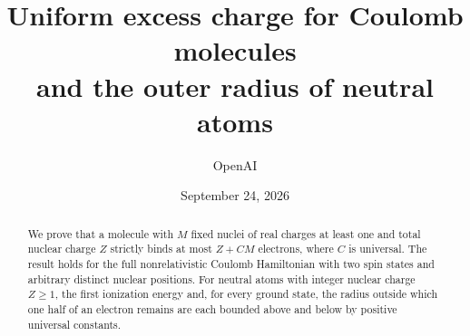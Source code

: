 \documentclass[11pt]{article}
\title{Uniform excess charge for Coulomb molecules\\and the outer radius of neutral atoms}
\author{OpenAI}
\date{September 24, 2026}
\theoremstyle{definition}
\theoremstyle{remark}
\numberwithin{equation}{section}
\newcommand{\1}{\mathbf 1}
\begin{document}
\maketitle
\begin{abstract}
We prove that a molecule with $M$ fixed nuclei of real charges at least one
and total nuclear charge $Z$ strictly binds at most $Z+CM$ electrons,
where $C$ is universal. The result holds for the full nonrelativistic
Coulomb Hamiltonian with two spin states and arbitrary distinct nuclear
positions. For neutral atoms with integer nuclear charge $Z\ge1$, the first
ionization energy and, for every ground state, the radius outside which
one half of an electron remains are each bounded above and below by positive
universal constants.
\end{abstract}
\tableofcontents


















\end{document}
